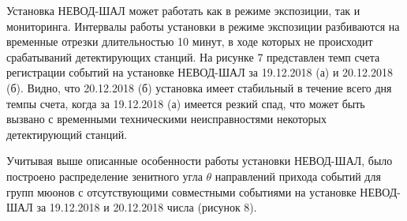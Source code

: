 Установка НЕВОД-ШАЛ может работать как в режиме экспозиции, так и мониторинга. Интервалы работы установки в режиме экспозиции разбиваются на временные отрезки длительностью 10 минут, в ходе которых не происходит срабатываний детектирующих станций.
На рисунке 7 представлен темп счета регистрации событий на установке НЕВОД-ШАЛ за 19.12.2018 (а) и 20.12.2018 (б). Видно, что 20.12.2018 (б) установка имеет стабильный в течение всего дня темпы счета, когда за 19.12.2018 (а) имеется резкий спад, что может быть вызвано с временными техническими неисправностями некоторых детектирующий станций. 

Учитывая выше описанные особенности работы установки НЕВОД-ШАЛ, было построено распределение зенитного угла \(\theta\) направлений прихода событий для групп мюонов с отсутствующими совместными событиями на установке НЕВОД-ШАЛ за 19.12.2018 и 20.12.2018 числа (рисунок 8). 

